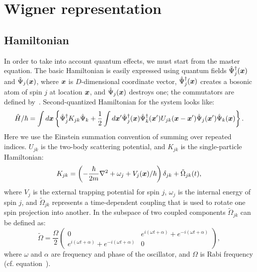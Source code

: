 \chapter{Wigner representation}
\label{cha:wigner}


\section{Hamiltonian}

In order to take into account quantum effects, we must start from the master equation.
The basic Hamiltonian is easily expressed using quantum fields $\hat{\Psi}_j^{\dagger}(\boldsymbol{x})$ and $\hat{\Psi}_j(\boldsymbol{x})$,
where $\boldsymbol{x}$ is $D$-dimensional coordinate vector,
$\hat{\Psi}_j^{\dagger}(\boldsymbol{x})$ creates a bosonic atom of spin $j$ at location $\boldsymbol{x}$,
and $\hat{\Psi}_j(\boldsymbol{x})$ destroys one;
the commutators are defined by~.
Second-quantized Hamiltonian for the system looks like:
\begin{equation}
\label{eqn:wigner:hamiltonian}
\begin{split}
	\hat{H} / \hbar = \int d\boldsymbol{x} \left\{
		\hat{\Psi}_j^{\dagger} K_{jk} \hat{\Psi}_k
		+ \frac{1}{2} \int d\boldsymbol{x}^\prime
			\hat{\Psi}_j^\dagger (\boldsymbol{x}) \hat{\Psi}_k^\dagger (\boldsymbol{x}^\prime)
			U_{jk}(\boldsymbol{x} - \boldsymbol{x}^\prime)
			\hat{\Psi}_j (\boldsymbol{x}^\prime) \hat{\Psi}_k (\boldsymbol{x})
	\right\}.
\end{split}
\end{equation}
Here we use the Einstein summation convention of summing over repeated indices.
$U_{jk}$ is the two-body scattering potential, and $K_{jk}$ is the single-particle Hamiltonian:
\begin{equation}
	K_{jk} = \left(
			-\frac{\hbar}{2m} \nabla^2 + \omega_j + V_j(\boldsymbol{x}) / \hbar
		\right) \delta_{jk}
		+ \tilde{\Omega}_{jk}(t),
\end{equation}
where $V_j$ is the external trapping potential for spin $j$,
$\omega_j$ is the internal energy of spin $j$,
and $\tilde{\Omega}_{jk}$ represents a time-dependent coupling that is used to rotate one spin projection into another.
In the subspace of two coupled components $\tilde{\Omega}_{jk}$ can be defined as:
\[
	\tilde{\Omega} = \frac{\Omega}{2} \begin{pmatrix}
		0 & e^{i(\omega t + \alpha)} + e^{-i(\omega t + \alpha)} \\
		e^{i (\omega t + \alpha)} + e^{-i(\omega t + \alpha)} & 0
	\end{pmatrix},
\]
where $\omega$ and $\alpha$ are frequency and phase of the oscillator,
and $\Omega$ is Rabi frequency (cf. equation~).

